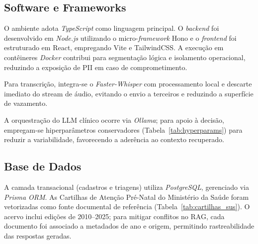 \documentclass[12pt]{article}
\begin{document}

\subsection{Software e Frameworks}

O ambiente adota \textit{TypeScript} como linguagem principal.
O \textit{backend} foi desenvolvido em \textit{Node.js} utilizando o micro-\textit{framework} Hono e o \textit{frontend} foi estruturado em React, empregando Vite e TailwindCSS.
A execução em contêineres \textit{Docker} contribui para segmentação lógica e isolamento operacional, reduzindo a exposição de PII em caso de comprometimento.

Para transcrição, integra-se o \textit{Faster-Whisper} com processamento local e descarte imediato do stream de áudio, evitando o envio a terceiros e reduzindo a superfície de vazamento.

A orquestração do LLM clínico ocorre via \textit{Ollama}; para apoio à decisão, empregam-se hiperparâmetros conservadores (Tabela~\ref{tab:hyperparams}) para reduzir a variabilidade, favorecendo a aderência ao contexto recuperado.

\subsection{Base de Dados}

A camada transacional (cadastros e triagens) utiliza \textit{PostgreSQL}, gerenciado via \textit{Prisma ORM}.
As Cartilhas de Atenção Pré-Natal do Ministério da Saúde foram vetorizadas como fonte documental de referência (Tabela~\ref{tab:cartilhas_sus}).
O acervo inclui edições de 2010--2025; para mitigar conflitos no RAG, cada documento foi associado a metadados de ano e origem, permitindo rastreabilidade das respostas geradas.
\end{document}
